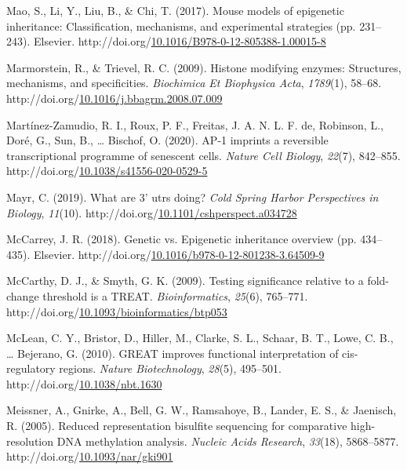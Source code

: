 \documentclass[12pt,twoside]{reedthesis}
\newlength{\cslhangindent}
\newenvironment{CSLReferences}[2] %
 {%
  \setlength{\parindent}{0pt}
  \ifodd #1 \everypar{\setlength{\hangindent}{\cslhangindent}}\ignorespaces\fi
  \ifnum #2 > 0
  \setlength{\parskip}{#2\baselineskip}
  \fi
 }%
 {}
\begin{document}
\begin{CSLReferences}{1}{0}
\leavevmode{}%
Mao, S., Li, Y., Liu, B., \& Chi, T. (2017). Mouse models of epigenetic inheritance: Classification, mechanisms, and experimental strategies (pp. 231--243). Elsevier. http://doi.org/\href{https://doi.org/10.1016/B978-0-12-805388-1.00015-8}{10.1016/B978-0-12-805388-1.00015-8}

\leavevmode{}%
Marmorstein, R., \& Trievel, R. C. (2009). Histone modifying enzymes: Structures, mechanisms, and specificities. \emph{Biochimica Et Biophysica Acta}, \emph{1789}(1), 58--68. http://doi.org/\href{https://doi.org/10.1016/j.bbagrm.2008.07.009}{10.1016/j.bbagrm.2008.07.009}

\leavevmode{}%
Martínez-Zamudio, R. I., Roux, P. F., Freitas, J. A. N. L. F. de, Robinson, L., Doré, G., Sun, B., \ldots{} Bischof, O. (2020). AP-1 imprints a reversible transcriptional programme of senescent cells. \emph{Nature Cell Biology}, \emph{22}(7), 842--855. http://doi.org/\href{https://doi.org/10.1038/s41556-020-0529-5}{10.1038/s41556-020-0529-5}

\leavevmode{}%
Mayr, C. (2019). What are 3' utrs doing? \emph{Cold Spring Harbor Perspectives in Biology}, \emph{11}(10). http://doi.org/\href{https://doi.org/10.1101/cshperspect.a034728}{10.1101/cshperspect.a034728}

\leavevmode{}%
McCarrey, J. R. (2018). Genetic vs. Epigenetic inheritance overview (pp. 434--435). Elsevier. http://doi.org/\href{https://doi.org/10.1016/b978-0-12-801238-3.64509-9}{10.1016/b978-0-12-801238-3.64509-9}

\leavevmode{}%
McCarthy, D. J., \& Smyth, G. K. (2009). Testing significance relative to a fold-change threshold is a TREAT. \emph{Bioinformatics}, \emph{25}(6), 765--771. http://doi.org/\href{https://doi.org/10.1093/bioinformatics/btp053}{10.1093/bioinformatics/btp053}

\leavevmode{}%
McLean, C. Y., Bristor, D., Hiller, M., Clarke, S. L., Schaar, B. T., Lowe, C. B., \ldots{} Bejerano, G. (2010). GREAT improves functional interpretation of cis-regulatory regions. \emph{Nature Biotechnology}, \emph{28}(5), 495--501. http://doi.org/\href{https://doi.org/10.1038/nbt.1630}{10.1038/nbt.1630}

\leavevmode{}%
Meissner, A., Gnirke, A., Bell, G. W., Ramsahoye, B., Lander, E. S., \& Jaenisch, R. (2005). Reduced representation bisulfite sequencing for comparative high-resolution DNA methylation analysis. \emph{Nucleic Acids Research}, \emph{33}(18), 5868--5877. http://doi.org/\href{https://doi.org/10.1093/nar/gki901}{10.1093/nar/gki901}


\end{CSLReferences}
\end{document}
